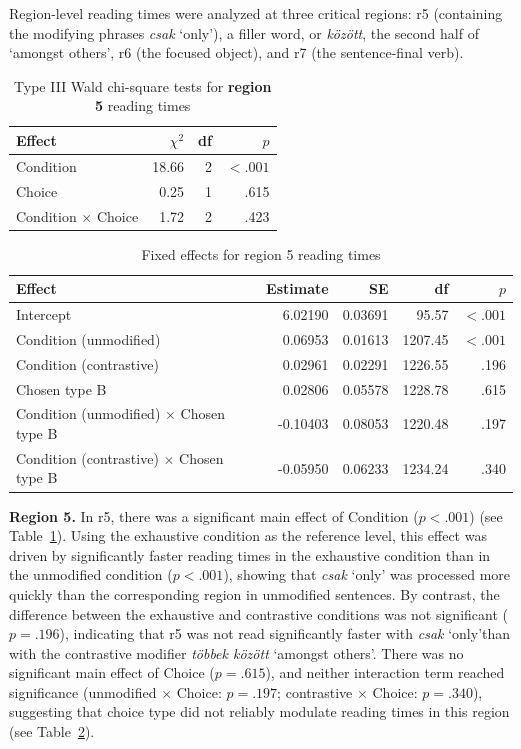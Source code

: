 \documentclass[a4paper, ruler]{CUP-JNL-LIN}%
\begin{document}
Region-level reading times were analyzed at three critical regions: r5 (containing the modifying phrases \textit{csak} `only'), a filler word, or \textit{között}, the second half of `amongst others', r6 (the focused object), and r7 (the sentence-final verb). 


\begin{table}[htbp]
\centering
\caption{Type III Wald chi-square tests for \textbf{region 5} reading times}
\label{tab:r5}
\begin{tabularx}{\textwidth}{@{}Xrrr@{}}
\toprule
Effect & $\chi^2$ & df & $p$ \\
\midrule
Condition & 18.66 & 2 & $< .001$ \\
Choice & 0.25 & 1 & .615 \\
Condition $\times$ Choice & 1.72 & 2 & .423 \\
\bottomrule
\end{tabularx}
\end{table}

\begin{table}[htbp]
\centering
\caption{Fixed effects for region 5 reading times}
\label{tab:r5-fixed}
\begin{tabularx}{\textwidth}{@{}Xrrrr@{}}
\toprule
Effect & Estimate & SE & df & $p$ \\
\midrule
Intercept & 6.02190 & 0.03691 & 95.57 & $< .001$ \\
Condition (unmodified) & 0.06953 & 0.01613 & 1207.45 & $< .001$ \\
Condition (contrastive) & 0.02961 & 0.02291 & 1226.55 & .196 \\
Chosen type B & 0.02806 & 0.05578 & 1228.78 & .615 \\
Condition (unmodified) $\times$ Chosen type B & -0.10403 & 0.08053 & 1220.48 & .197 \\
Condition (contrastive) $\times$ Chosen type B & -0.05950 & 0.06233 & 1234.24 & .340 \\
\bottomrule
\end{tabularx}
\end{table}

\noindent \textbf{Region 5.} In r5, there was a significant main effect of Condition ($p<.001$) (see Table~\ref{tab:r5}). Using the exhaustive condition as the reference level, this effect was driven by significantly faster reading times in the exhaustive condition than in the unmodified condition ($p<.001$), showing that \textit{csak} `only' was processed more quickly than the corresponding region in unmodified sentences. By contrast, the difference between the exhaustive and contrastive conditions was not significant ($p=.196$), indicating that r5 was not read significantly faster with \textit{csak} `only'than with the contrastive modifier \textit{többek között} `amongst others'. There was no significant main effect of Choice ($p=.615$), and neither interaction term reached significance (unmodified $\times$ Choice: $p=.197$; contrastive $\times$ Choice: $p=.340$), suggesting that choice type did not reliably modulate reading times in this region (see Table~\ref{tab:r5-fixed}).
\end{document}

